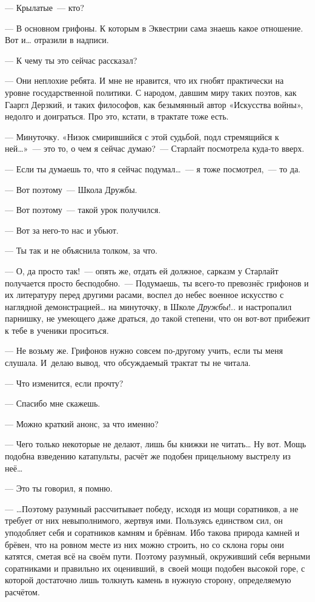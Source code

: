 \documentclass[fontsize=11pt,a5paper,titlepage=firstcover]{scrbook}
\begin{document}
--- Крылатые~--- кто?

--- В основном грифоны. К которым в Эквестрии сама знаешь какое отношение. Вот и{\ldots} отразили в надписи.

--- К чему ты это сейчас рассказал?

--- Они неплохие ребята. И мне не нравится, что их гнобят практически на уровне государственной политики. С народом, давшим миру таких поэтов, как Гааргл Дерзкий, и таких философов, как безымянный автор «Искусства войны», недолго и доиграться. Про это, кстати, в трактате тоже есть.

--- Минуточку. «Низок смирившийся с этой судьбой, подл стремящийся к ней{\ldots}»~--- это то, о чем я сейчас думаю?~--- Старлайт посмотрела куда-то вверх.

--- Если ты думаешь то, что я сейчас подумал{\ldots}~--- я тоже посмотрел,~--- то да.

--- Вот поэтому~--- Школа Дружбы.

--- Вот поэтому~--- такой урок получился.

--- Вот за него-то нас и убьют.

--- Ты так и не объяснила толком, за что.

--- О, да просто так!~--- опять же, отдать ей должное, сарказм у Старлайт получается просто бесподобно.~--- Подумаешь, ты всего-то превознёс грифонов и их литературу перед другими расами, воспел до небес военное искусство с наглядной демонстрацией{\ldots} на минуточку, в Школе \emph{Дружбы}!.. и настропалил парнишку, не умеющего даже драться, до такой степени, что он вот-вот прибежит к тебе в ученики проситься.

--- Не возьму же. Грифонов нужно совсем по-другому учить, если ты меня слушала. И~делаю вывод, что обсуждаемый трактат ты не читала.

--- Что изменится, если прочту?

--- Спасибо мне скажешь.

--- Можно краткий анонс, за что именно?

--- Чего только некоторые не делают, лишь бы книжки не читать{\ldots} Ну вот. Мощь подобна взведению катапульты, расчёт же подобен прицельному выстрелу из неё{\ldots}

--- Это ты говорил, я помню.

--- {\ldots}Поэтому разумный рассчитывает победу, исходя из мощи соратников, а не требует от них невыполнимого, жертвуя ими. Пользуясь единством сил, он уподобляет себя и соратников камням и брёвнам. Ибо такова природа камней и брёвен, что на ровном месте из них можно строить, но со склона горы они катятся, сметая всё на своём пути. Поэтому разумный, окруживший себя верными соратниками и правильно их оценивший, в~своей мощи подобен высокой горе, с которой достаточно лишь толкнуть камень в нужную сторону, определяемую расчётом.
\end{document}
